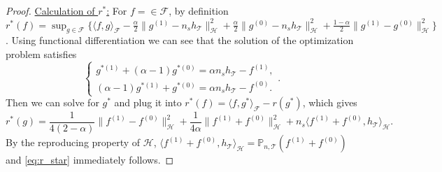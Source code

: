 \documentclass[12pt]{article}
\newcommand{\prob}{\mathbb{P}}
\begin{document}
\begin{proof}
	\noindent\underline{Calculation of $r^*$:}
	For $f = \in \mathcal{F}$, by definition
	$
	r^*(f) = \sup_{g \in \mathcal{F}}
	\{ \langle f, g \rangle_\mathcal{F} -
	\frac{\alpha}{2} \| g^{(1)} - n_s h_\mathcal{T} \|_\mathcal{H}^2 + 
	\frac{\alpha}{2} \| g^{(0)} - n_s h_\mathcal{T} \|_\mathcal{H}^2 +
	\frac{1-\alpha}{2} \| g^{(1)} - g^{(0)} \|_\mathcal{H}^2\}
	$.
	Using functional differentiation we can see that the solution of the optimization problem satisfies
	\begin{equation*}
		\begin{cases}
			g^{*(1)} + (\alpha - 1)  g^{*(0)} = \alpha n_s h_\mathcal{T} - f^{(1)}, \\
			(\alpha - 1) g^{*(1)} +  g^{*(0)} = \alpha n_s h_\mathcal{T} - f^{(0)}.
		\end{cases}
		.\end{equation*}
	Then we can solve for $g^*$ and plug it into $r^*(f) = \langle f, g^* \rangle_\mathcal{F} - r(g^*)$, which gives
	\begin{equation*}
		r^*(g) = 
		\frac{1}{4(2-\alpha)} \| f^{(1)} - f^{(0)} \|_\mathcal{H}^2 +
		\frac{1}{4\alpha} \| f^{(1)} + f^{(0)} \|_\mathcal{H}^2 +
		n_s \langle f^{(1)} + f^{(0)}, h_\mathcal{T} \rangle_{\mathcal{H}}
		.\end{equation*}
	By the reproducing property of $\mathcal{H}$, $\langle f^{(1)} + f^{(0)}, h_\mathcal{T} \rangle_{\mathcal{H}} = \prob_{n, \mathcal{T}}(f^{(1)} + f^{(0)})$ and \eqref{eq:r_star} immediately follows.
\end{proof}
\end{document}
